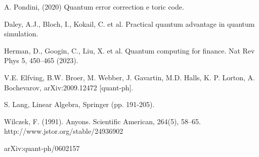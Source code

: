 \documentclass[12pt]{report}
\begin{document}
\begin{thebibliography}{99}
		 A. Pondini, (2020) Quantum error correction e toric code.
		
		 Daley, A.J., Bloch, I., Kokail, C. et al. Practical quantum advantage in quantum simulation.
		
		 Herman, D., Googin, C., Liu, X. et al. Quantum computing for finance. Nat Rev Phys 5, 450–465 (2023).
		
		 V.E. Elfving, B.W. Broer, M. Webber, J. Gavartin, M.D. Halls, K. P. Lorton, A. Bochevarov, arXiv:2009.12472 [quant-ph].
		
		 S. Lang, Linear Algebra, Springer (pp. 191-205).
		
		 Wilczek, F. (1991). Anyons. Scientific American, 264(5), 58–65. http://www.jstor.org/stable/24936902


                	arXiv:quant-ph/0602157
  
	\end{thebibliography}
	
\end{document}
